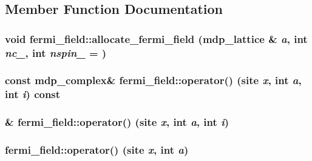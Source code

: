 \subsection{Member Function Documentation}
\hypertarget{classfermi__field_a4c185655183158f2f68edf3588d551d2}{
\subsubsection[{allocate\_\-fermi\_\-field}]{\setlength{\rightskip}{0pt plus 5cm}void fermi\_\-field::allocate\_\-fermi\_\-field ({\bf mdp\_\-lattice} \& {\em a}, \/  int {\em nc\_\-}, \/  int {\em nspin\_\-} = {})}}
\label{classfermi__field_a4c185655183158f2f68edf3588d551d2}
\hypertarget{classfermi__field_a9850eef1de12386a50b0ce8c28507573}{
\subsubsection[{operator()}]{\setlength{\rightskip}{0pt plus 5cm}const {\bf mdp\_\-complex}\& fermi\_\-field::operator() (site {\em x}, \/  int {\em a}, \/  int {\em i}) const}}
\label{classfermi__field_a9850eef1de12386a50b0ce8c28507573}
\hypertarget{classfermi__field_a4f277f994dedde0d25448bb2f2a57b52}{
\subsubsection[{operator()}]{\& fermi\_\-field::operator() (site {\em x}, \/  int {\em a}, \/  int {\em i})}}
\label{classfermi__field_a4f277f994dedde0d25448bb2f2a57b52}
\hypertarget{classfermi__field_adbdc4231bf39f4d4d350471d587b0bd0}{
\subsubsection[{operator()}]{ fermi\_\-field::operator() (site {\em x}, \/  int {\em a})}}
